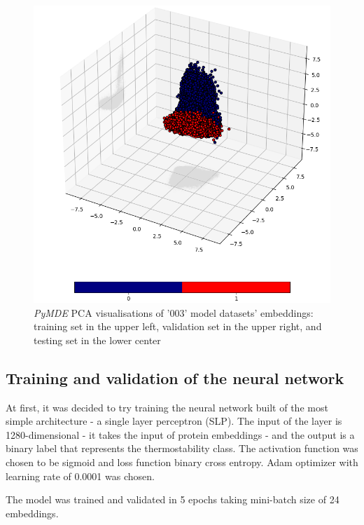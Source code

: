 \documentclass[12pt]{report}
\begin{document}
\begin{figure}[h!]
		\includegraphics[scale=0.3]{003_test_v2_MDE_PCA.png}

		\caption{\textit{PyMDE} PCA visualisations of '003' model datasets' embeddings: training set
				in the upper left, validation set in the upper right, and 
				testing set in the lower center}
		\label{figure:PyMDEPCAembeddings003}
	\end{figure}

	\newpage

	\subsection{Training and validation of the neural network}

	At first, it was decided to try training the neural network built of
	the most simple architecture - a single layer perceptron (SLP). The input of the 
	layer is 1280-dimensional - it takes the input of protein embeddings - and the 
	output is a binary label that represents the thermostability class. The 
	activation function was chosen to be sigmoid and loss function binary cross
	entropy. Adam optimizer with learning rate of 0.0001 was chosen.

	The model was trained and validated in 5 epochs taking mini-batch size of 24
	embeddings.
\end{document}
